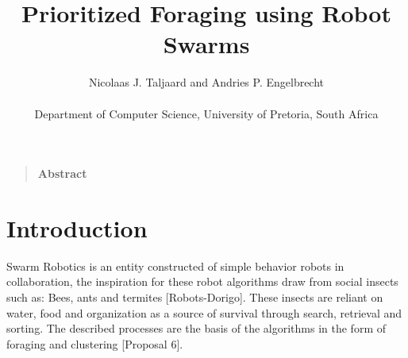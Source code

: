 \documentclass[12pt]{article}
\title{Prioritized Foraging using Robot Swarms}
\author
{Nicolaas J. Taljaard and Andries P. Engelbrecht\\
\\
\normalsize{Department of Computer Science, University of Pretoria, South Africa}\\
}
\date{}
\newenvironment{sciabstract}{%
\begin{quote} \bf}
{\end{quote}}
\begin{document}
 


\baselineskip24pt


\maketitle 




\begin{sciabstract}
  Abstract
\end{sciabstract}




\section{Introduction}

\par{Swarm Robotics is an entity constructed of simple behavior  robots in collaboration, the inspiration for these robot algorithms draw from social insects such as: Bees, ants and termites [Robots-Dorigo]. These insects are reliant on water, food and organization as a source of survival through search, retrieval and sorting. The described processes are the basis of the algorithms in the form of foraging and clustering [Proposal 6].}
\end{document}
